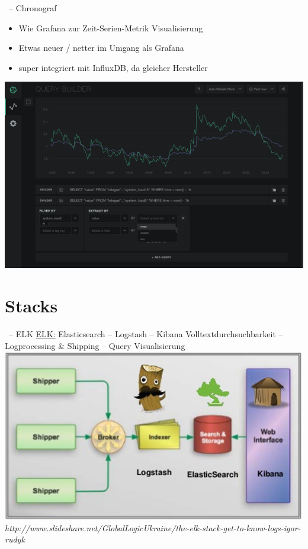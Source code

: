 \documentclass{beamer}
\begin{document}
\begin{frame}{\insertsection\ -- Chronograf}
	\begin{itemize}
		\item Wie Grafana zur Zeit-Serien-Metrik Visualisierung
		\item Etwas neuer / netter im Umgang als Grafana
		\item super integriert mit InfluxDB, da gleicher Hersteller
	\end{itemize}
	\includegraphics[width=0.8\linewidth,page=1]{img/chronograf.png}
\end{frame}

\section{Stacks}

\begin{frame}{\insertsection\ -- ELK}
	\underline{ELK:} Elasticsearch -- Logstash -- Kibana
	Volltextdurchsuchbarkeit -- Logprocessing \& Shipping -- Query Visualisierung
	\includegraphics[width=0.8\linewidth,page=1]{img/ELK-stack.jpg}\\
	\fontsize{4pt}{7.2}\selectfont
	\textit{http://www.slideshare.net/GlobalLogicUkraine/the-elk-stack-get-to-know-logs-igor-rudyk}
\end{frame}
\end{document}

